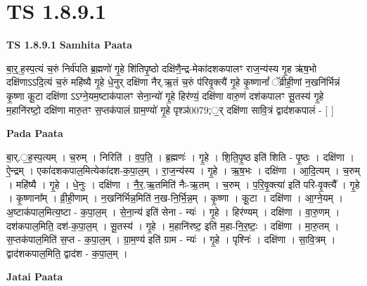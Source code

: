 \documentclass[17pt]{extarticle}
\begin{document}
\section{ TS 1.8.9.1 }

\textbf{TS 1.8.9.1 } \newline
\textbf{Samhita Paata} \newline

बा॒र्॒.ह॒स्प॒त्यं च॒रुं निर्व॑पति ब्र॒ह्मणो॑ गृ॒हे शि॑तिपृ॒ष्ठो दक्षि॑णै॒न्द्र-मेका॑दशकपालꣳ राज॒न्य॑स्य गृ॒ह ऋ॑ष॒भो दक्षि॑णाऽऽदि॒त्यं च॒रुं महि॑ष्यै गृ॒हे धे॒नुर् दक्षि॑णा नैर्.ऋ॒तं च॒रुं प॑रिवृ॒क्त्यै॑ गृ॒हे कृ॒ष्णानां᳚ ॅव्रीही॒णां न॒खनि॑र्भिन्नं कृ॒ष्णा कू॒टा दक्षि॑णा ऽऽग्ने॒यम॒ष्टाक॑पालꣳ सेना॒न्यो॑ गृ॒हे हिर॑ण्यं॒ दक्षि॑णा वारु॒णं दश॑कपालꣳ सू॒तस्य॑ गृ॒हे म॒हानि॑रष्टो॒ दक्षि॑णा मारु॒तꣳ स॒प्तक॑पालं ग्राम॒ण्यो॑ गृ॒हे पृश्ञ॑0079;॒र् दक्षि॑णा सावि॒त्रं द्वाद॑शकपालं - [ ] \newline

\textbf{Pada Paata} \newline

बा॒र्.॒ह॒स्प॒त्यम् । च॒रुम् । निरिति॑ । व॒प॒ति॒ । ब्र॒ह्मणः॑ । गृ॒हे । शि॒ति॒पृ॒ष्ठ इति॑ शिति - पृ॒ष्ठः । दक्षि॑णा । ऐ॒न्द्रम् । एका॑दशकपाल॒मित्येका॑दश-क॒पा॒ल॒म् । रा॒ज॒न्य॑स्य । गृ॒हे । ऋ॒ष॒भः । दक्षि॑णा । आ॒दि॒त्यम् । च॒रुम् । महि॑ष्यै । गृ॒हे । धे॒नुः । दक्षि॑णा । नै॒र॒.ऋ॒तमिति॑ नैः-ऋ॒तम् । च॒रुम् । प॒रि॒वृ॒क्त्या॑ इति॑ परि-वृ॒क्त्यै᳚ । गृ॒हे । कृ॒ष्णाना᳚म् । व्री॒ही॒णाम् । न॒खनि॑र्भिन्न॒मिति॑ न॒ख-नि॒र्भि॒न्न॒म् । कृ॒ष्णा । कू॒टा । दक्षि॑णा । आ॒ग्ने॒यम् । अ॒ष्टाक॑पाल॒मित्य॒ष्टा - क॒पा॒ल॒म् । से॒ना॒न्य॑ इति॑ सेना - न्यः॑ । गृ॒हे । हिर॑ण्यम् । दक्षि॑णा । वा॒रु॒णम् । दश॑कपाल॒मिति॒ दश॑-क॒पा॒ल॒म् । सू॒तस्य॑ । गृ॒हे । म॒हानि॑रष्ट॒ इति॑ म॒हा-नि॒र॒ष्टः॒ । दक्षि॑णा । मा॒रु॒तम् । स॒प्तक॑पाल॒मिति॑ स॒प्त - क॒पा॒ल॒म् । ग्रा॒म॒ण्य॑ इति॑ ग्राम - न्यः॑ । गृ॒हे । पृश्निः॑ । दक्षि॑णा । सा॒वि॒त्रम् । द्वाद॑शकपाल॒मिति॒ द्वाद॑श - क॒पा॒ल॒म् ।  \newline



\textbf{Jatai Paata} \newline
\end{document}
